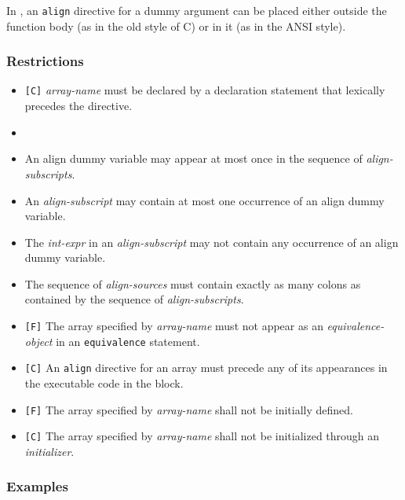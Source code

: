 In {\XMPC}, an {\tt align} directive for a dummy argument can be placed
either outside the function body (as in the old style of C) or in it (as
in the ANSI style).

\subsubsection*{Restrictions}

\begin{itemize}
 \item \verb![C]! {\it array-name} must be declared by a declaration
       statement that lexically precedes the directive.
\item {}
\item An align dummy variable may appear at most once in the sequence of
      {\it align-subscripts}.
\item An {\it align-subscript} may contain at most one occurrence of an
      align dummy variable.
\item The {\it int-expr} in an {\it align-subscript} may not contain any
      occurrence of an align dummy variable.
\item The sequence of {\it align-sources} must contain exactly as many
      colons as contained by the sequence of {\it align-subscripts}.
\item \verb![F]! The array specified by {\it array-name} must not appear
      as an {\it equivalence-object} in an {\tt equivalence} statement.
\item \verb![C]! An {\tt align} directive for an array must
      precede any of its appearances in the executable code in the block.
\item \verb![F]! The array specified by {\it array-name} shall not be
	  initially defined.
\item \verb![C]! The array specified by {\it array-name} shall not be
	  initialized through an {\it initializer}.
\end{itemize}

\subsubsection*{Examples}

